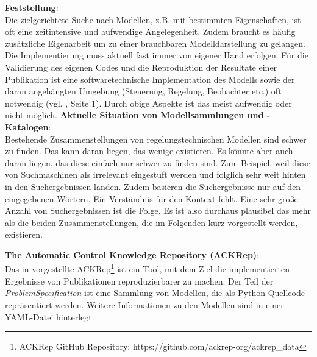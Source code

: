 \textbf{Feststellung}:\\
Die zielgerichtete Suche nach Modellen, z.B. mit bestimmten Eigenschaften, ist oft eine zeitintensive und aufwendige Angelegenheit. Zudem braucht es häufig zusätzliche Eigenarbeit um zu einer brauchbaren Modelldarstellung zu gelangen. Die Implementierung muss aktuell fast immer von eigener Hand erfolgen. Für die Validierung des eigenen Codes und die Reproduktion der Resultate einer Publikation ist eine softwaretechnische Implementation des Modells sowie der daran angehängten Umgebung (Steuerung, Regelung, Beobachter etc.) oft notwendig (vgl. \cite{KNHE20b}, Seite 1). Durch obige Aspekte ist das meist aufwendig oder nicht möglich.
\textbf{Aktuelle Situation von Modellsammlungen und -Katalogen}: \\
Bestehende Zusammenstellungen von regelungstechnischen Modellen sind schwer zu finden. Das kann daran liegen, das wenige existieren. Es könnte aber auch daran liegen, das diese einfach nur schwer zu finden sind. Zum Beispiel, weil diese von Suchmaschinen als irrelevant eingestuft werden und folglich sehr weit hinten in den Suchergebnissen landen. Zudem basieren die Suchergebnisse nur auf den eingegebenen Wörtern. Ein Verständnis für den Kontext fehlt. Eine sehr große Anzahl von Suchergebnissen ist die Folge. Es ist also durchaus plausibel das mehr als die beiden Zusammenstellungen, die im Folgenden kurz vorgestellt werden, existieren. 

\textbf{The Automatic Control Knowledge Repository (ACKRep)}:\\
Das in \cite{KNHE20a} vorgestellte ACKRep\footnote{ACKRep GitHub Repository: https://github.com/ackrep-org/ackrep\_data} ist ein Tool, mit dem Ziel die implementierten Ergebnisse von Publikationen reproduzierbarer zu machen. Der Teil der \textit{ProblemSpecification} ist eine Sammlung von Modellen, die als Python-Quellcode repräsentiert werden. Weitere Informationen zu den Modellen sind in einer YAML-Datei hinterlegt. 

